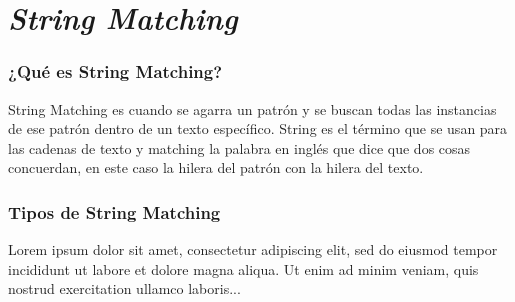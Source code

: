 \part*{\textit{String Matching}}%

\section*{¿Qué es String Matching?}

\quad String Matching es cuando se agarra un patrón y se buscan todas las instancias de ese patrón dentro de un texto específico. String es el término que se usan para las cadenas de texto y matching la palabra en inglés que dice que dos cosas concuerdan, en este caso la hilera del patrón con la hilera del texto.

\section*{Tipos de String Matching}

Lorem ipsum dolor sit amet, consectetur adipiscing elit, sed do 
eiusmod tempor incididunt ut labore et dolore magna aliqua. Ut 
enim ad minim veniam, quis nostrud exercitation ullamco laboris...
